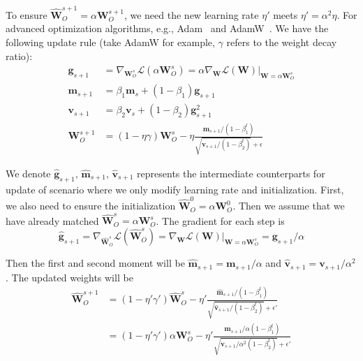  To ensure $\hat{\boldsymbol{W}}_O^{s+1}=\alpha\boldsymbol{W}_O^{s+1}$, we need the new learning rate $\eta'$ meets $\eta'=\alpha^2\eta$. For advanced optimization algorithms, e.g., Adam~\citep{kingma2014adam} and AdamW~\citep{loshchilov2017decoupled}. We have the following update rule (take AdamW for example, $\gamma$ refers to the weight decay ratio): 
 \begin{align}
\boldsymbol{g}_{s+1} &= \nabla_{\boldsymbol{W}_O^{s}} \mathcal{L}(\alpha\boldsymbol{W}_O^{s}) = \alpha\nabla_{\boldsymbol{W}} \mathcal{L}(\boldsymbol{W})|_{\boldsymbol{W}=\alpha\boldsymbol{W}_O^{s}} \\
\boldsymbol{m}_{s+1} &= \beta_1\boldsymbol{m}_{s} + (1-\beta_1)\boldsymbol{g}_{s+1} \\
\boldsymbol{v}_{s+1} &= \beta_2\boldsymbol{v}_{s} + (1-\beta_2)\boldsymbol{g}^2_{s+1} \\
\boldsymbol{W}_O^{s+1}&=(1-\eta\gamma) \boldsymbol{W}_O^{s} - \eta \frac{\boldsymbol{m}_{s+1} / (1 - \beta_1^t)}{\sqrt{\boldsymbol{v}_{s+1}/ (1-\beta_2^t)} + \epsilon}
\end{align}

We denote $\hat{\boldsymbol{g}}_{s+1},\,\hat{\boldsymbol{m}}_{s+1},\,\hat{\boldsymbol{v}}_{s+1}$ represents the intermediate counterparts for update of scenario where we only modify learning rate and initialization. First, we also need to ensure the initialization $\hat{\boldsymbol{W}}_O^{0}=\alpha\boldsymbol{W}_O^{0}$. Then we assume that we have already matched $\hat{\boldsymbol{W}}_O^{s}=\alpha\boldsymbol{W}_O^{s}$. The gradient for each step is
\begin{equation}
    \hat{\boldsymbol{g}}_{s+1} = \nabla_{\hat{\boldsymbol{W}}_O^{s}} \mathcal{L}(\hat{\boldsymbol{W}}_O^{s}) = \nabla_{\boldsymbol{W}} \mathcal{L}(\boldsymbol{W})|_{\boldsymbol{W}=\alpha\boldsymbol{W}_O^{s}}= \boldsymbol{g}_{s+1} / \alpha
\end{equation}

Then the first and second moment will be $\hat{\boldsymbol{m}}_{s+1}=\boldsymbol{m}_{s+1} / \alpha$ and  $\hat{\boldsymbol{v}}_{s+1}=\boldsymbol{v}_{s+1} / \alpha^2$. The updated weights will be 
\begin{align}
\hat{\boldsymbol{W}}_O^{s+1}&=(1-\eta'\gamma') \hat{\boldsymbol{W}}_O^{s} - \eta' \frac{\hat{\boldsymbol{m}}_{s+1} / (1 - \beta_1^t)}{\sqrt{\hat{\boldsymbol{v}}_{s+1}/ (1-\beta_2^t)} + \epsilon'}\\    
&=(1-\eta'\gamma') \alpha\boldsymbol{W}_O^{s} - \eta' \frac{\boldsymbol{m}_{s+1} /\alpha(1 - \beta_1^t)}{\sqrt{\boldsymbol{v}_{s+1}/ \alpha^2(1-\beta_2^t)} + \epsilon'} 
\end{align}

